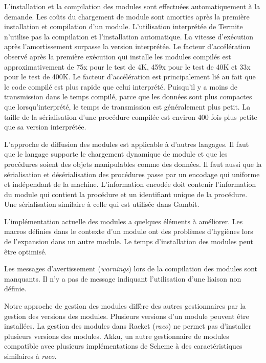 L'installation et la compilation des modules sont effectuées automatiquement à
la demande.  Les coûts du chargement de module sont amorties après la première
installation et compilation d'un module. L'utilisation interprétée de Termite
n'utilise pas la compilation et l'installation automatique.  La vitesse
d'exécution après l'amortissement surpasse la version interprétée.  Le facteur
d'accélération observé après la première exécution qui installe les modules
compilés est approximativement de 75x pour le test de 4K, 459x pour le test de
40K et 33x pour le test de 400K.  Le facteur d'accélération est principalement
lié au fait que le code compilé est plus rapide que celui interprété.
Puisqu'il y a moins de transmission dans le temps compilé, parce que les
données sont plus compactes que lorsqu'interprété, le temps de transmission est
généralement plus petit. La taille de la sérialisation d'une procédure compilée
est environ 400 fois plus petite que sa version interprétée.

L'approche de diffusion des modules est applicable à d'autres langages.
Il faut que le langage supporte le chargement dynamique de module et
que les procédures soient des objets manipulables comme des données.
Il faut aussi que la sérialisation et désérialisation des procédures
passe par un encodage qui uniforme et indépendant de la machine.
L'information encodée doit contenir l'information du module qui contient
la procédure et un identifiant unique de la procédure. Une
sérialisation similaire à celle qui est utilisée dans Gambit.


L'implémentation actuelle des modules a quelques éléments à améliorer.
Les macros définies dans le contexte d'un module ont des problèmes d'hygiènes
lors de l'expansion dans un autre module. Le temps d'installation des modules
peut être optimisé.

Les messages d'avertissement (\textit{warnings}) lors de la compilation
des modules sont manquants. Il n'y a pas de message indiquant l'utilisation
d'une liaison non définie.

Notre approche de gestion des modules diffère des autres gestionnaires par la
gestion des versions des modules. Plusieurs versions d'un module peuvent être
installées. La gestion des modules dans Racket (\textit{raco}) ne permet pas
d'installer plusieurs versions des modules. Akku, un autre gestionnaire de modules
compatible avec plusieurs implémentations de Scheme à des caractéristiques
similaires à \textit{raco}.



